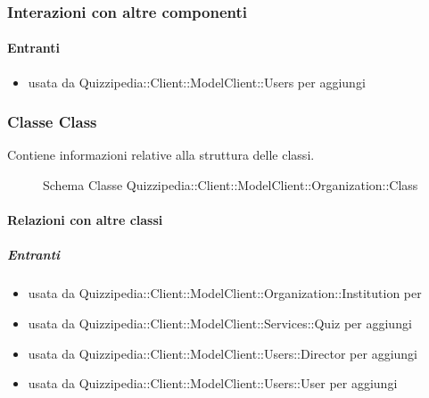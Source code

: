 \subsubsection{Interazioni con altre componenti}
\paragraph{Entranti}
\begin{itemize}
\item usata da Quizzipedia::Client::ModelClient::Users per aggiungi
\end{itemize}
\subsubsection{Classe Class}
Contiene informazioni relative alla struttura delle classi.
\begin{figure}[H]
\centering
\noindent{}
\caption[Schema Classe Class]{Schema Classe Quizzipedia::Client::ModelClient::Organization::Class}
\end{figure}
\paragraph{Relazioni con altre classi}
\subparagraph{Entranti}
\begin{itemize}
\item usata da Quizzipedia::Client::ModelClient::Organization::Institution per 
\item usata da Quizzipedia::Client::ModelClient::Services::Quiz per aggiungi
\item usata da Quizzipedia::Client::ModelClient::Users::Director per aggiungi
\item usata da Quizzipedia::Client::ModelClient::Users::User per aggiungi
\end{itemize}
